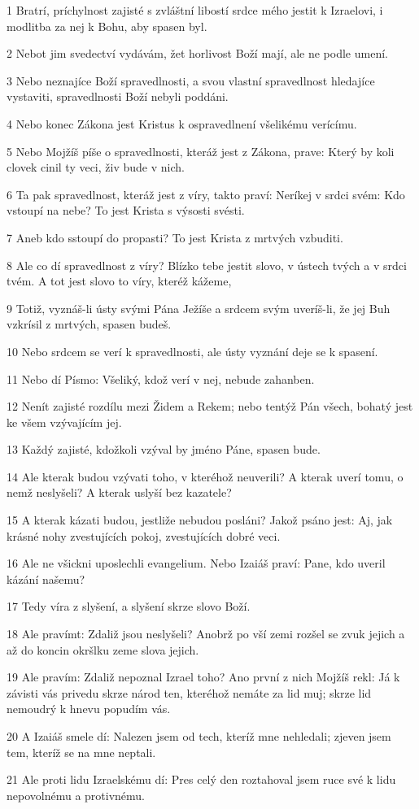 \par 1 Bratrí, príchylnost zajisté s zvláštní libostí srdce mého jestit k Izraelovi, i modlitba za nej k Bohu, aby spasen byl.
\par 2 Nebot jim svedectví vydávám, žet horlivost Boží mají, ale ne podle umení.
\par 3 Nebo neznajíce Boží spravedlnosti, a svou vlastní spravedlnost hledajíce vystaviti, spravedlnosti Boží nebyli poddáni.
\par 4 Nebo konec Zákona jest Kristus k ospravedlnení všelikému verícímu.
\par 5 Nebo Mojžíš píše o spravedlnosti, kteráž jest z Zákona, prave: Který by koli clovek cinil ty veci, živ bude v nich.
\par 6 Ta pak spravedlnost, kteráž jest z víry, takto praví: Neríkej v srdci svém: Kdo vstoupí na nebe? To jest Krista s výsosti svésti.
\par 7 Aneb kdo sstoupí do propasti? To jest Krista z mrtvých vzbuditi.
\par 8 Ale co dí spravedlnost z víry? Blízko tebe jestit slovo, v ústech tvých a v srdci tvém. A tot jest slovo to víry, kteréž kážeme,
\par 9 Totiž, vyznáš-li ústy svými Pána Ježíše a srdcem svým uveríš-li, že jej Buh vzkrísil z mrtvých, spasen budeš.
\par 10 Nebo srdcem se verí k spravedlnosti, ale ústy vyznání deje se k spasení.
\par 11 Nebo dí Písmo: Všeliký, kdož verí v nej, nebude zahanben.
\par 12 Nenít zajisté rozdílu mezi Židem a Rekem; nebo tentýž Pán všech, bohatý jest ke všem vzývajícím jej.
\par 13 Každý zajisté, kdožkoli vzýval by jméno Páne, spasen bude.
\par 14 Ale kterak budou vzývati toho, v kteréhož neuverili? A kterak uverí tomu, o nemž neslyšeli? A kterak uslyší bez kazatele?
\par 15 A kterak kázati budou, jestliže nebudou posláni? Jakož psáno jest: Aj, jak krásné nohy zvestujících pokoj, zvestujících dobré veci.
\par 16 Ale ne všickni uposlechli evangelium. Nebo Izaiáš praví: Pane, kdo uveril kázání našemu?
\par 17 Tedy víra z slyšení, a slyšení skrze slovo Boží.
\par 18 Ale pravímt: Zdaliž jsou neslyšeli? Anobrž po vší zemi rozšel se zvuk jejich a až do koncin okršlku zeme slova jejich.
\par 19 Ale pravím: Zdaliž nepoznal Izrael toho? Ano první z nich Mojžíš rekl: Já k závisti vás privedu skrze národ ten, kteréhož nemáte za lid muj; skrze lid nemoudrý k hnevu popudím vás.
\par 20 A Izaiáš smele dí: Nalezen jsem od tech, kteríž mne nehledali; zjeven jsem tem, kteríž se na mne neptali.
\par 21 Ale proti lidu Izraelskému dí: Pres celý den roztahoval jsem ruce své k lidu nepovolnému a protivnému.

